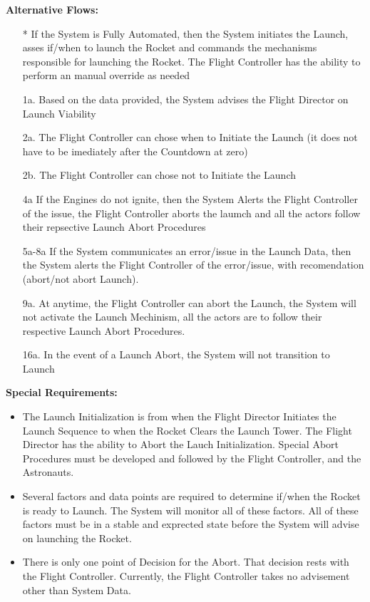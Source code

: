 \documentclass[letterpaper]{article}
\begin{document}
\textbf{Alternative Flows:}
\begin{itemize}
\item[*]  If the System is Fully Automated, then the System initiates
the Launch, asses if/when to launch the Rocket and commands the
mechanisms responsible for launching the Rocket.  The Flight
Controller has the ability to perform an manual override as needed
\item[1a.]Based on the data provided, the System advises the Flight
Director on Launch Viability
\item[2a.]The Flight Controller can chose when to Initiate the Launch 
(it
does not have to be imediately after the Countdown at zero)
\item[2b.]The Flight Controller can chose not to Initiate the Launch
\item[4a]If the Engines do not ignite, then the System Alerts the
Flight Controller of the issue, the Flight Controller aborts the
laumch and all the actors follow their repsective Launch Abort
Procedures
\item[5a-8a]If the System communicates an error/issue in the Launch
Data, then the System alerts the Flight Controller of the error/issue,
with recomendation (abort/not abort Launch).
\item[9a.]At anytime, the Flight Controller can abort the Launch, the
System will not activate the Launch Mechinism, all the actors are to
follow their respective Launch Abort Procedures.
\item[16a.]In the event of a Launch Abort, the System will not
transition to Launch
\end{itemize}
\textbf{Special Requirements:}
\begin{itemize}
\item The Launch Initialization is from when the Flight Director
Initiates the Launch Sequence to when the Rocket Clears the Launch
Tower.  The Flight Director has the ability to Abort the Lauch
Initialization.  Special Abort Procedures must be developed and
followed by the Flight Controller, and the Astronauts.
\item Several factors and data points are required to determine
if/when the Rocket is ready to Launch.  The System will monitor all
of these factors.  All of these factors must be in a stable and
exprected state before the System will advise on launching the Rocket.
\item There is only one point of Decision for the Abort.  That decision
rests with the Flight Controller.  Currently, the Flight Controller
takes no advisement other than System Data.
\end{itemize}
\end{document}
